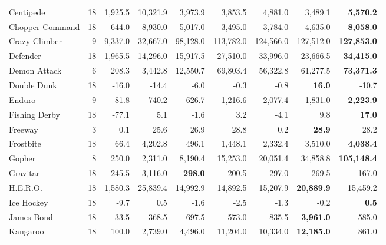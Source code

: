 \begin{table}[t]
\begin{center}
\begin{tabular}{l|rrr|rrr|rr}
           Centipede &              18 &    1,925.5 &  10,321.9 &    3,973.9 &    3,853.5 &    4,881.0 &    3,489.1 &{\bf5,570.2}\\
     Chopper Command &              18 &      644.0 &   8,930.0 &    5,017.0 &    3,495.0 &    3,784.0 &    4,635.0 &{\bf8,058.0}\\
       Crazy Climber &               9 &    9,337.0 &  32,667.0 &   98,128.0 &  113,782.0 &  124,566.0 &  127,512.0 &{\bf127,853.0}\\
            Defender &              18 &    1,965.5 &  14,296.0 &   15,917.5 &   27,510.0 &   33,996.0 &   23,666.5 &{\bf34,415.0}\\
        Demon Attack &               6 &      208.3 &   3,442.8 &   12,550.7 &   69,803.4 &   56,322.8 &   61,277.5 &{\bf73,371.3}\\
         Double Dunk &              18 &      -16.0 &     -14.4 &       -6.0 &       -0.3 &       -0.8 &{\bf16.0}&        -10.7 \\
              Enduro &               9 &      -81.8 &     740.2 &      626.7 &    1,216.6 &    2,077.4 &    1,831.0 &{\bf2,223.9}\\
       Fishing Derby &              18 &      -77.1 &       5.1 &       -1.6 &        3.2 &       -4.1 &        9.8 &{\bf17.0}\\
             Freeway &               3 &        0.1 &      25.6 &       26.9 &       28.8 &        0.2 &{\bf28.9}&         28.2 \\
           Frostbite &              18 &       66.4 &   4,202.8 &      496.1 &    1,448.1 &    2,332.4 &    3,510.0 &{\bf4,038.4}\\
              Gopher &               8 &      250.0 &   2,311.0 &    8,190.4 &   15,253.0 &   20,051.4 &   34,858.8 &{\bf105,148.4}\\
            Gravitar &              18 &      245.5 &   3,116.0 &{\bf298.0}&      200.5 &      297.0 &      269.5 &        167.0 \\
            H.E.R.O. &              18 &    1,580.3 &  25,839.4 &   14,992.9 &   14,892.5 &   15,207.9 &{\bf20,889.9}&     15,459.2 \\
          Ice Hockey &              18 &       -9.7 &       0.5 &       -1.6 &       -2.5 &       -1.3 &       -0.2 &{\bf0.5}\\
          James Bond &              18 &       33.5 &     368.5 &      697.5 &      573.0 &      835.5 &{\bf3,961.0}&        585.0 \\
            Kangaroo &              18 &      100.0 &   2,739.0 &    4,496.0 &   11,204.0 &   10,334.0 &{\bf12,185.0}&        861.0 \\

\end{tabular}
\end{center}
\end{table}
